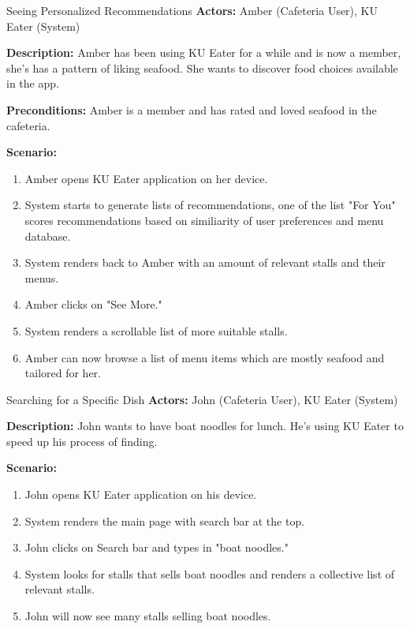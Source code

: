 \begin{usecase}{Seeing Personalized Recommendations}
    \textbf{Actors:} Amber (Cafeteria User), KU Eater (System)
    
    \textbf{Description:} Amber has been using KU Eater for a while and is now a member, she's has a pattern of liking seafood.
    She wants to discover food choices available in the app.

    \textbf{Preconditions:} Amber is a member and has rated and loved seafood in the cafeteria.

    \textbf{Scenario:}

    \begin{enumerate}[leftmargin=80pt]
        \item Amber opens KU Eater application on her device.
        \item System starts to generate lists of recommendations, one of the list "For You" scores recommendations
        based on similiarity of user preferences and menu database.
        \item System renders back to Amber with an amount of relevant stalls and their menus.
        \item Amber clicks on "See More."
        \item System renders a scrollable list of more suitable stalls.
        \item Amber can now browse a list of menu items which are mostly seafood and tailored for her.
    \end{enumerate}
\end{usecase}

\begin{usecase}{Searching for a Specific Dish}
    \textbf{Actors:} John (Cafeteria User), KU Eater (System)
    
    \textbf{Description:} John wants to have boat noodles for lunch. He's using KU Eater to speed up
    his process of finding.

    \textbf{Scenario:}

    \begin{enumerate}[leftmargin=80pt]
        \item John opens KU Eater application on his device.
        \item System renders the main page with search bar at the top.
        \item John clicks on Search bar and types in "boat noodles."
        \item System looks for stalls that sells boat noodles and renders a collective list of relevant stalls.
        \item John will now see many stalls selling boat noodles.
    \end{enumerate}
\end{usecase}

